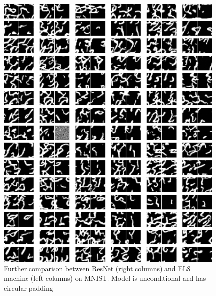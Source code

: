 \documentclass{article}
\theoremstyle{plain}
\theoremstyle{definition}
\theoremstyle{remark}
\begin{document}
\begin{figure}
    \centering
    \includegraphics[width=0.9\linewidth]{mnist_circular_samps_resnet_m.png}
    \caption{Further comparison between ResNet (right columns) and ELS machine (left columns) on MNIST. Model is unconditional and has circular padding.}
    \label{fig:mnist-circular-resnet}
\end{figure}
\end{document}
